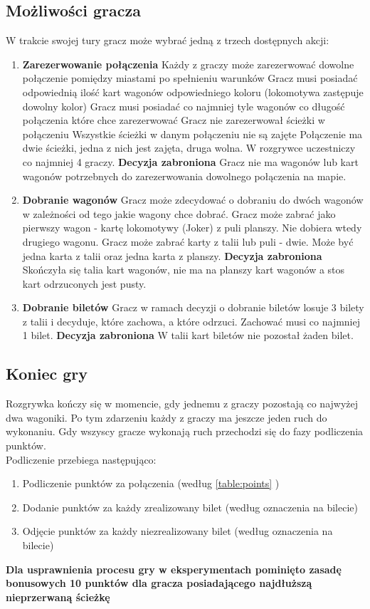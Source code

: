 \documentclass[12pt, oneside]{report}
\begin{document}
\subsection{Możliwości gracza}
W trakcie swojej tury gracz może wybrać jedną z trzech dostępnych akcji:
\begin{enumerate}
	\item \textbf{Zarezerwowanie połączenia} 
	\subitem Każdy z graczy może zarezerwować dowolne połączenie pomiędzy miastami po spełnieniu warunków
	\subitem Gracz musi posiadać odpowiednią ilość kart wagonów odpowiedniego koloru (lokomotywa zastępuje dowolny kolor)
	\subitem Gracz musi posiadać co najmniej tyle wagonów co długość połączenia które chce zarezerwować
	\subitem Gracz nie zarezerwował ścieżki w połączeniu
	\subitem Wszystkie ścieżki w danym połączeniu nie są zajęte
	\subitem Połączenie ma dwie ścieżki, jedna z nich jest zajęta, druga wolna. W rozgrywce uczestniczy co najmniej 4 graczy.
	\subitem \textbf{Decyzja zabroniona} Gracz nie ma wagonów lub kart wagonów potrzebnych do zarezerwowania dowolnego połączenia na mapie.
	\item \textbf{Dobranie wagonów}
	\subitem Gracz może zdecydować o dobraniu do dwóch wagonów w zależności od tego jakie wagony chce dobrać. 
	\subitem Gracz może zabrać jako pierwszy wagon - kartę lokomotywy (Joker) z puli planszy. Nie dobiera wtedy drugiego wagonu.
	\subitem Gracz może zabrać karty z talii lub puli - dwie. Może być jedna karta z talii oraz jedna karta z planszy.
	\subitem \textbf{Decyzja zabroniona} Skończyła się talia kart wagonów, nie ma na planszy kart wagonów a stos kart odrzuconych jest pusty.
	\item \textbf{Dobranie biletów}
	\subitem Gracz w ramach decyzji o dobranie biletów losuje 3 bilety z talii i decyduje, które zachowa, a które odrzuci. Zachować musi co najmniej 1 bilet.
	\subitem \textbf{Decyzja zabroniona} W talii kart biletów nie pozostał żaden bilet.
\end{enumerate}
\subsection{Koniec gry}
Rozgrywka kończy się w momencie, gdy jednemu z graczy pozostają co najwyżej dwa wagoniki. Po tym zdarzeniu każdy z graczy ma jeszcze jeden ruch do wykonaniu. Gdy wszyscy gracze wykonają ruch przechodzi się do fazy podliczenia punktów. \\
Podliczenie przebiega następująco:
\begin{enumerate}
	\item Podliczenie punktów za połączenia (według \ref{table:points} )
	\item Dodanie punktów za każdy zrealizowany bilet (według oznaczenia na bilecie)
	\item Odjęcie punktów za każdy niezrealizowany bilet (według oznaczenia na bilecie)
\end{enumerate}
\textbf{Dla usprawnienia procesu gry w eksperymentach pominięto zasadę bonusowych 10 punktów dla gracza posiadającego najdłuższą nieprzerwaną ścieżkę}
\end{document}
